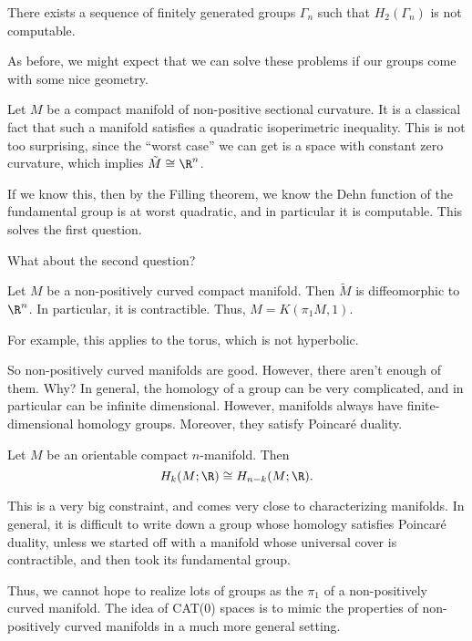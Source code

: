 \documentclass[a4paper]{article}
\begin{document}
\begin{thm}[Gordan] %
  There exists a sequence of finitely generated groups $\Gamma_n$ such that $H_2(\Gamma_n)$ is not computable.
\end{thm}

As before, we might expect that we can solve these problems if our groups come with some nice geometry.

Let $M$ be a compact manifold of non-positive sectional curvature. It is a classical fact that such a manifold satisfies a quadratic isoperimetric inequality. This is not too surprising, since the ``worst case'' we can get is a space with constant zero curvature, which implies $\tilde{M} \cong \R^n$.

If we know this, then by the Filling theorem, we know the Dehn function of the fundamental group is at worst quadratic, and in particular it is computable. This solves the first question.

What about the second question?
\begin{thm}
  Let $M$ be a non-positively curved compact manifold. Then $\tilde{M}$ is diffeomorphic to $\R^n$. In particular, it is contractible. Thus, $M = K(\pi_1 M, 1)$.
\end{thm}
For example, this applies to the torus, which is not hyperbolic.

So non-positively curved manifolds are good. However, there aren't enough of them. Why? In general, the homology of a group can be very complicated, and in particular can be infinite dimensional. However, manifolds always have finite-dimensional homology groups. Moreover, they satisfy Poincar\'e duality.

\begin{thm}
  Let $M$ be an orientable compact $n$-manifold. Then
  \[
    H_k(M; \R) \cong H_{n - k}(M; \R).
  \]
\end{thm}
This is a very big constraint, and comes very close to characterizing manifolds. In general, it is difficult to write down a group whose homology satisfies Poincar\'e duality, unless we started off with a manifold whose universal cover is contractible, and then took its fundamental group.

Thus, we cannot hope to realize lots of groups as the $\pi_1$ of a non-positively curved manifold. The idea of CAT(0) spaces is to mimic the properties of non-positively curved manifolds in a much more general setting.
\end{document}
